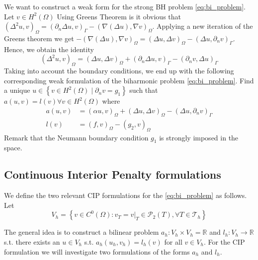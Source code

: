 We want to construct a weak form for the strong BH problem \eqref{eq:bi_problem}. Let $v \in H^{2}( \Omega ) $  Using Greens Theorem is it obvious that \(
\left( \Delta ^2 u,v \right) _{ \Omega  }   = ( \partial _{n} \Delta u, v ) _{\Gamma   } - ( \nabla \left( \Delta  u \right) , \nabla v ) _{ \Omega }
\).
Applying a new iteration of the Greens theorem we get
$ -( \nabla ( \Delta u ) , \nabla v ) _{\Omega  }  =   ( \Delta u, \Delta v ) _{\Omega } - ( \Delta u, \partial _{n}v )_{\Gamma } $.
Hence, we obtain the identity
\begin{equation}
\label{eq:iden_bi}
( \Delta ^2 u, v ) _{\Omega } = ( \Delta u, \Delta v)_{\Omega } +  ( \partial _{n} \Delta u, v)_{\Gamma } - ( \partial _{n} v, \Delta u) _{\Gamma }
\end{equation}
Taking into account the boundary conditions, we end up with the following corresponding weak formulation of the biharmonic problem \eqref{eq:bi_problem}.
Find a unique $u \in \left\{ v \in  H^2( \Omega )  \mid \partial _{n} v  = g_{1}   \right\}  $ such that $a( u,v) = l( v)  \forall v \in H^{2}( \Omega )  $ where
  \[
      \begin{split}
a( u,v) & =  ( \alpha u,v)_{\Omega } + ( \Delta u, \Delta v)_{\Omega } - (  \Delta u, \partial _{n} v) _{\Gamma }\\
l( v)  &= ( f,v)_{\Omega } - ( g_{2} , v)_\Omega
      \end{split}
\]
Remark that the Neumann boundary condition $g_{1}$ is strongly imposed in the space.


\subsection{Continuous Interior Penalty formulations}%
\label{sub:continuous_interior_penalty_formulations}

We define the two relevant CIP formulations for the \eqref{eq:bi_problem} as follows. Let $$V_{h} = \left\{ v \in C^{0}\left( \Omega  \right): v_{T} = v | _{T} \in \mathcal{P} _{2}\left( T \right), \forall T \in
\mathcal{T}_{h}    \right\}$$

The general idea is to construct a bilinear problem $a_{h}: V_{h} \times  V_{h} = \mathbb{R} $ and $l_{h}: V_{h} \to \mathbb{R} $ s.t. there exists an $u \in V_{h}$ s.t. $a_{h}( u_{h}, v_{h}) = l_{h}( v) $ for all $v \in V_{h}$. For the CIP
formulation we will investigate two formulations of the forms $a_{h}$ and $l_{h}$.

